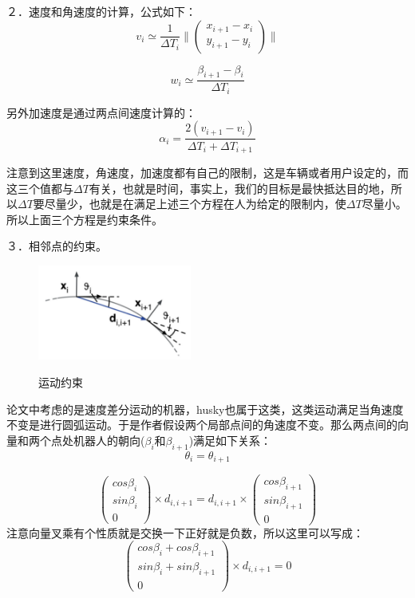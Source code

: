 \documentclass[10pt,a4paper]{article}
\theoremstyle{mythm}
\numberwithin{equation}{section}
\begin{document}
２．速度和角速度的计算，公式如下：
\begin{equation}
v_i \simeq \frac{1}{\Delta T_i}\|\left(
\begin{array}{lr}
x_{i+1}-x_i\\
y_{i+1}-y_i
\end{array}
\right)
\|
\label{eq:velocity}
\end{equation}

\begin{equation}
w_i \simeq \frac{\beta_{i+1}-\beta_i}{\Delta T_i}
\label{eq:rad}
\end{equation}

另外加速度是通过两点间速度计算的：
\begin{equation}
\alpha_i =  \frac{2(v_{i+1}-v_i)}{\Delta T_i+\Delta T_{i+1}}
\label{eq:accelerate}
\end{equation}

注意到这里速度，角速度，加速度都有自己的限制，这是车辆或者用户设定的，而这三个值都与$\Delta T$有关，也就是时间，事实上，我们的目标是最快抵达目的地，所以$\Delta T$要尽量少，也就是在满足上述三个方程在人为给定的限制内，使$\Delta T$尽量小。所以上面三个方程是约束条件。

３．相邻点的约束。
\begin{figure}[htbp]
\centering  %
\label{Fig.main}
\includegraphics[width=0.45\textwidth]{TEB_1}
\caption{运动约束}
\end{figure}
论文中考虑的是速度差分运动的机器，husky也属于这类，这类运动满足当角速度不变是进行圆弧运动。于是作者假设两个局部点间的角速度不变。那么两点间的向量和两个点处机器人的朝向($\beta_i$和$\beta_{i+1}$)满足如下关系：
\begin{equation}
\theta_i =  \theta_{i+1}
\label{eq:theta_equal}
\end{equation}

\begin{equation}
\left(
	\begin{array}{lr}
	cos\beta_i\\
	sin\beta_i\\
	0\end{array}
\right)\times d_{i,i+1} = d_{i,i+1}\times
\left(
	\begin{array}{lr}
	cos\beta_{i+1}\\
	sin\beta_{i+1}\\
	0\end{array}
\right)
\label{eq:sinTheta_equal}
\end{equation}
注意向量叉乘有个性质就是交换一下正好就是负数，所以这里可以写成：
$$
\left(
	\begin{array}{lr}
	cos\beta_i+cos\beta_{i+1}\\
	sin\beta_i+sin\beta_{i+1}\\
	0\end{array}
\right)\times d_{i,i+1} = 0
$$
\end{document}
